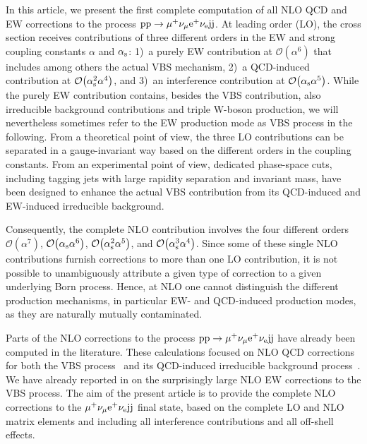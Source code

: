 \documentclass[a4article,11pt]{article}
\begin{document}
In this article, we present the first complete computation of all NLO
QCD and EW corrections to the process
$\text{p}\text{p}\to\mu^+\nu_\mu\text{e}^+\nu_{\text{e}}\text{j}\text{j}$.
At leading order (LO), the cross section receives contributions of
three different orders in the EW and strong coupling constants
$\alpha$ and $\alpha_\text{s}$: 1)~a purely EW
contribution at $\mathcal{O}{\left(\alpha^{6}\right)}$ that includes
among others the actual VBS mechanism, 2)~a QCD-induced contribution
at $\mathcal{O}{\left(\alpha_\text{s}^{2}\alpha^{4}\right)}$, and 3)~an
interference contribution at $\mathcal{O}{\left(\alpha_{\rm
      s}\alpha^{5}\right)}$. While the purely EW contribution contains,
besides the VBS contribution, also irreducible background
contributions and triple W-boson production, we will nevertheless sometimes
refer to the EW production mode as VBS process in the following.  From
a theoretical point of view, the three LO contributions can be
separated in a gauge-invariant way based on the different orders in
the coupling constants. 
From an experimental point of view, dedicated
phase-space cuts, including tagging jets with large rapidity separation
and invariant mass, have been designed to enhance
the actual VBS contribution from its QCD-induced
and EW-induced irreducible background.

Consequently, the complete NLO contribution involves the four
different orders $\mathcal{O}{\left(\alpha^{7}\right)}$,
$\mathcal{O}{\left(\alpha_\text{s}\alpha^{6}\right)}$,
$\mathcal{O}{\left(\alpha_\text{s}^{2}\alpha^{5}\right)}$, and
$\mathcal{O}{\left(\alpha_\text{s}^{3}\alpha^{4}\right)}$. Since some
of these single NLO contributions furnish corrections to more than one
LO contribution, it is not possible to unambiguously
attribute a given type of correction to a given underlying Born
process. Hence, at NLO one cannot distinguish the different production
mechanisms, in particular EW- and QCD-induced production modes, as they
are naturally mutually contaminated.

Parts of the NLO corrections to the process
$\text{p}\text{p}\to\mu^+\nu_\mu\text{e}^+\nu_{\text{e}}\text{j}\text{j}$ have already been
computed 
in the literature.  
These calculations focused on NLO QCD corrections for both
the VBS process~\cite{Jager:2009xx,Jager:2011ms,Denner:2012dz,
  Rauch:2016pai} and its QCD-induced irreducible background
process~\cite{Melia:2010bm,Melia:2011gk,Campanario:2013gea,Baglio:2014uba,Rauch:2016pai}.
We have already reported in  on the
surprisingly large NLO EW corrections to the VBS process.
The aim of the present article is to provide the complete NLO
corrections to the $\mu^+\nu_\mu\text{e}^+\nu_{\text{e}}\text{j}\text{j}$ final state,
based on the complete LO and NLO matrix elements and including all
interference contributions and all off-shell effects.
\end{document}
